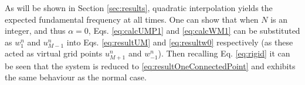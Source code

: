 As will be shown in Section \ref{sec:results}, quadratic interpolation yields the expected fundamental frequency at all times. One can show that when $N$ is an integer, and thus $\alpha = 0$, Eqs. \eqref{eq:calcUMP1} and \eqref{eq:calcWM1} can be substituted as $w_1^n$ and $u_{M-1}^n$ into Eqs. \eqref{eq:resultUM} and \eqref{eq:resultw0} respectively (as these acted as virtual grid points $u_{M+1}^n$ and $w_{-1}^n$). Then recalling Eq. \eqref{eq:rigid} it can be seen that the system is reduced to \eqref{eq:resultOneConnectedPoint} and exhibits the same behaviour as the normal case. %

